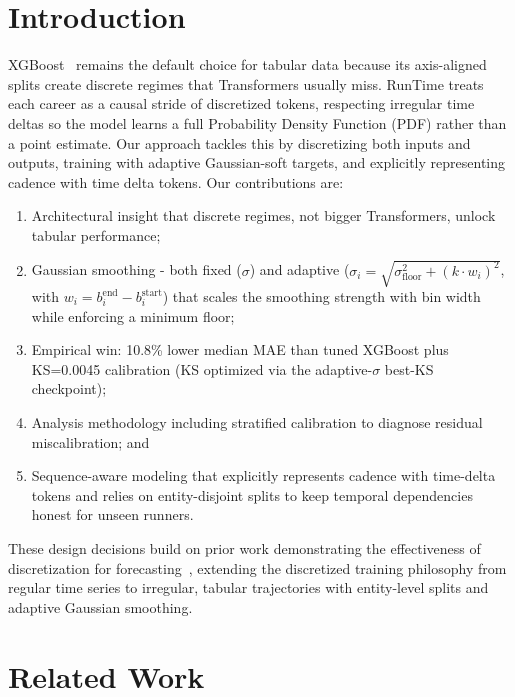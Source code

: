 \documentclass{article}
\begin{document}
\section{Introduction}
XGBoost~\cite{chen2016xgboost} remains the default choice for tabular data because its axis-aligned splits create discrete regimes that Transformers usually miss.  RunTime treats each career as a causal stride of discretized tokens, respecting irregular time deltas so the model learns a full Probability Density Function (PDF) rather than a point estimate. Our approach tackles this by discretizing both inputs and outputs, training with adaptive Gaussian-soft targets, and explicitly representing cadence with time delta tokens. Our contributions are:
\begin{enumerate}[nosep]
  \item Architectural insight that discrete regimes, not bigger Transformers, unlock tabular performance;
  \item Gaussian smoothing - both fixed (\(\sigma\)) and adaptive (\(\sigma_i = \sqrt{\sigma_{\text{floor}}^2 + (k \cdot w_i)^2}\), with \(w_i = b_i^{\text{end}} - b_i^{\text{start}}\)) that scales the smoothing strength with bin width while enforcing a minimum floor;
  \item Empirical win: 10.8\% lower median MAE than tuned XGBoost plus KS=0.0045 calibration (KS optimized via the adaptive-\(\sigma\) best-KS checkpoint);
  \item Analysis methodology including stratified calibration to diagnose residual miscalibration; and
  \item Sequence-aware modeling that explicitly represents cadence with time-delta tokens and relies on entity-disjoint splits to keep temporal dependencies honest for unseen runners.
\end{enumerate}
These design decisions build on prior work demonstrating the effectiveness of discretization for forecasting~\cite{rabanser2020discretization,ansari2024chronos,ansari2025chronos2}, extending the discretized training philosophy from regular time series to irregular, tabular trajectories with entity-level splits and adaptive Gaussian smoothing.
\section{Related Work}
\end{document}
